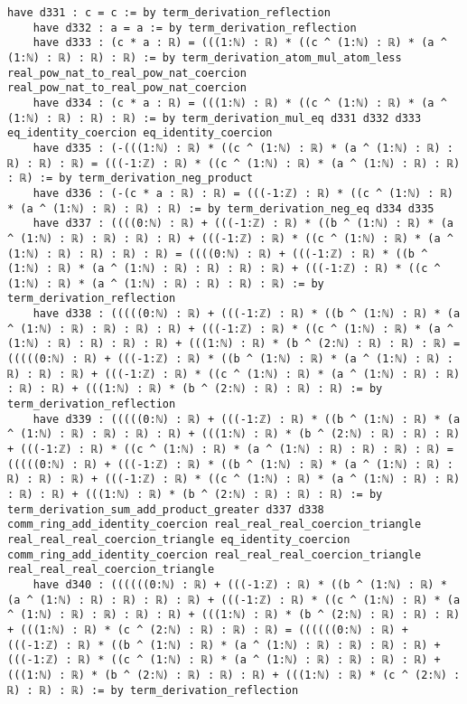 \documentclass{article}
\begin{document}
\begin{tcolorbox}[colback=white!10, width=\linewidth]
\begin{lstlisting}[language=Lean4]
    have d331 : c = c := by term_derivation_reflection
    have d332 : a = a := by term_derivation_reflection
    have d333 : (c * a : ℝ) = (((1:ℕ) : ℝ) * ((c ^ (1:ℕ) : ℝ) * (a ^ (1:ℕ) : ℝ) : ℝ) : ℝ) := by term_derivation_atom_mul_atom_less real_pow_nat_to_real_pow_nat_coercion real_pow_nat_to_real_pow_nat_coercion
    have d334 : (c * a : ℝ) = (((1:ℕ) : ℝ) * ((c ^ (1:ℕ) : ℝ) * (a ^ (1:ℕ) : ℝ) : ℝ) : ℝ) := by term_derivation_mul_eq d331 d332 d333 eq_identity_coercion eq_identity_coercion
    have d335 : (-(((1:ℕ) : ℝ) * ((c ^ (1:ℕ) : ℝ) * (a ^ (1:ℕ) : ℝ) : ℝ) : ℝ) : ℝ) = (((-1:ℤ) : ℝ) * ((c ^ (1:ℕ) : ℝ) * (a ^ (1:ℕ) : ℝ) : ℝ) : ℝ) := by term_derivation_neg_product
    have d336 : (-(c * a : ℝ) : ℝ) = (((-1:ℤ) : ℝ) * ((c ^ (1:ℕ) : ℝ) * (a ^ (1:ℕ) : ℝ) : ℝ) : ℝ) := by term_derivation_neg_eq d334 d335
    have d337 : ((((0:ℕ) : ℝ) + (((-1:ℤ) : ℝ) * ((b ^ (1:ℕ) : ℝ) * (a ^ (1:ℕ) : ℝ) : ℝ) : ℝ) : ℝ) + (((-1:ℤ) : ℝ) * ((c ^ (1:ℕ) : ℝ) * (a ^ (1:ℕ) : ℝ) : ℝ) : ℝ) : ℝ) = ((((0:ℕ) : ℝ) + (((-1:ℤ) : ℝ) * ((b ^ (1:ℕ) : ℝ) * (a ^ (1:ℕ) : ℝ) : ℝ) : ℝ) : ℝ) + (((-1:ℤ) : ℝ) * ((c ^ (1:ℕ) : ℝ) * (a ^ (1:ℕ) : ℝ) : ℝ) : ℝ) : ℝ) := by term_derivation_reflection
    have d338 : (((((0:ℕ) : ℝ) + (((-1:ℤ) : ℝ) * ((b ^ (1:ℕ) : ℝ) * (a ^ (1:ℕ) : ℝ) : ℝ) : ℝ) : ℝ) + (((-1:ℤ) : ℝ) * ((c ^ (1:ℕ) : ℝ) * (a ^ (1:ℕ) : ℝ) : ℝ) : ℝ) : ℝ) + (((1:ℕ) : ℝ) * (b ^ (2:ℕ) : ℝ) : ℝ) : ℝ) = (((((0:ℕ) : ℝ) + (((-1:ℤ) : ℝ) * ((b ^ (1:ℕ) : ℝ) * (a ^ (1:ℕ) : ℝ) : ℝ) : ℝ) : ℝ) + (((-1:ℤ) : ℝ) * ((c ^ (1:ℕ) : ℝ) * (a ^ (1:ℕ) : ℝ) : ℝ) : ℝ) : ℝ) + (((1:ℕ) : ℝ) * (b ^ (2:ℕ) : ℝ) : ℝ) : ℝ) := by term_derivation_reflection
    have d339 : (((((0:ℕ) : ℝ) + (((-1:ℤ) : ℝ) * ((b ^ (1:ℕ) : ℝ) * (a ^ (1:ℕ) : ℝ) : ℝ) : ℝ) : ℝ) + (((1:ℕ) : ℝ) * (b ^ (2:ℕ) : ℝ) : ℝ) : ℝ) + (((-1:ℤ) : ℝ) * ((c ^ (1:ℕ) : ℝ) * (a ^ (1:ℕ) : ℝ) : ℝ) : ℝ) : ℝ) = (((((0:ℕ) : ℝ) + (((-1:ℤ) : ℝ) * ((b ^ (1:ℕ) : ℝ) * (a ^ (1:ℕ) : ℝ) : ℝ) : ℝ) : ℝ) + (((-1:ℤ) : ℝ) * ((c ^ (1:ℕ) : ℝ) * (a ^ (1:ℕ) : ℝ) : ℝ) : ℝ) : ℝ) + (((1:ℕ) : ℝ) * (b ^ (2:ℕ) : ℝ) : ℝ) : ℝ) := by term_derivation_sum_add_product_greater d337 d338 comm_ring_add_identity_coercion real_real_real_coercion_triangle real_real_real_coercion_triangle eq_identity_coercion comm_ring_add_identity_coercion real_real_real_coercion_triangle real_real_real_coercion_triangle
    have d340 : ((((((0:ℕ) : ℝ) + (((-1:ℤ) : ℝ) * ((b ^ (1:ℕ) : ℝ) * (a ^ (1:ℕ) : ℝ) : ℝ) : ℝ) : ℝ) + (((-1:ℤ) : ℝ) * ((c ^ (1:ℕ) : ℝ) * (a ^ (1:ℕ) : ℝ) : ℝ) : ℝ) : ℝ) + (((1:ℕ) : ℝ) * (b ^ (2:ℕ) : ℝ) : ℝ) : ℝ) + (((1:ℕ) : ℝ) * (c ^ (2:ℕ) : ℝ) : ℝ) : ℝ) = ((((((0:ℕ) : ℝ) + (((-1:ℤ) : ℝ) * ((b ^ (1:ℕ) : ℝ) * (a ^ (1:ℕ) : ℝ) : ℝ) : ℝ) : ℝ) + (((-1:ℤ) : ℝ) * ((c ^ (1:ℕ) : ℝ) * (a ^ (1:ℕ) : ℝ) : ℝ) : ℝ) : ℝ) + (((1:ℕ) : ℝ) * (b ^ (2:ℕ) : ℝ) : ℝ) : ℝ) + (((1:ℕ) : ℝ) * (c ^ (2:ℕ) : ℝ) : ℝ) : ℝ) := by term_derivation_reflection

\end{lstlisting}
\end{tcolorbox}
\end{document}
